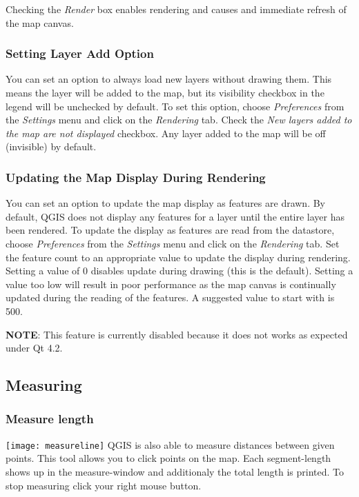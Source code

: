 Checking the \textit{Render} box enables rendering and causes and immediate
refresh of the map canvas.

\subsubsection{Setting Layer Add Option}\label{label_settinglayer}

You can set an option to always load new layers without drawing them. This
means the layer will be added to the map, but its visibility checkbox in the
legend will be unchecked by default. To set this option, choose
\textit{Preferences} from the \textit{Settings} menu and click on the
\textit{Rendering} tab. Check the \textit{New layers added to the map are not
displayed} checkbox. Any layer added to the map will be off (invisible) by
default.

\subsubsection{Updating the Map Display During Rendering}
\label{label_updatemap}

You can set an option to update the map display as features are drawn. By
default, QGIS does not display any features for a layer until the entire
layer has been rendered. To update the display as features are read from the
datastore, choose \textit{Preferences} from the \textit{Settings} menu and
click on the \textit{Rendering} tab. Set the feature count to an
appropriate value to update the display during rendering. Setting a value of 0
disables update during drawing (this is the default). Setting a value too low
will result in poor performance as the map canvas is continually updated
during the reading of the features. A suggested value to start with is 500. 

\textbf{NOTE}: This feature is currently disabled because it does not works
as expected under Qt 4.2.

\subsection{Measuring}\label{sec:measure}

\subsubsection{Measure length}
\texttt{[image: measureline]} QGIS is also able to measure distances between given points. 
This tool allows you to click points on the map. Each segment-length shows up in the measure-window and additionaly
the total length is printed. To stop measuring click your right mouse button.

